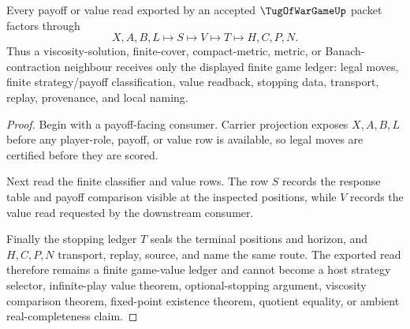 \begin{theorem}
\label{thm:tug-of-war-game-payoff-ledger}
Every payoff or value read exported by an accepted $\TugOfWarGameUp$ packet factors through
$$
X,A,B,L \longmapsto S \longmapsto V \longmapsto T \longmapsto H,C,P,N.
$$
Thus a viscosity-solution, finite-cover, compact-metric, metric, or Banach-contraction neighbour receives only the displayed finite game ledger: legal moves, finite strategy/payoff classification, value readback, stopping data, transport, replay, provenance, and local naming.
\end{theorem}
\begin{proof}
Begin with a payoff-facing consumer. Carrier projection exposes $X,A,B,L$ before any player-role, payoff, or value row is available, so legal moves are certified before they are scored.

Next read the finite classifier and value rows. The row $S$ records the response table and payoff comparison visible at the inspected positions, while $V$ records the value read requested by the downstream consumer.

Finally the stopping ledger $T$ seals the terminal positions and horizon, and $H,C,P,N$ transport, replay, source, and name the same route. The exported read therefore remains a finite game-value ledger and cannot become a host strategy selector, infinite-play value theorem, optional-stopping argument, viscosity comparison theorem, fixed-point existence theorem, quotient equality, or ambient real-completeness claim.
\end{proof}




